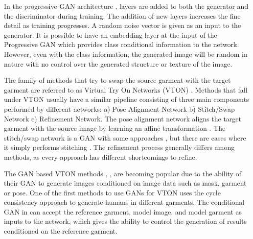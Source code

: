 \documentclass[11pt]{article}
\begin{document}
In the progressive GAN architecture
\citet{PGAN}, layers are added to both the generator and the discriminator during training. 
The addition of new layers increases the fine detail as training progresses. 
A random noise vector is given as an input to the generator. It is possible to have an embedding layer \citet{ConGAN} at the input of the Progressive GAN which provides class conditional information to the network. However, even with the class information, the generated image will be random in nature with no control over the generated structure or texture of the image.

The family of methods that try to swap the source garment with the target garment are referred to as Virtual Try On Networks (VTON) \citet{CP-VTON} \citet{MG-VTON} \citet{VITON}. Methods that fall under VTON usually have a similar pipeline consisting of three main components performed by different networks: a) Pose Alignment Network b) Stitch/Swap Network c) Refinement Network. The pose alignment network aligns the target garment with the source image by learning an affine transformation \citet{GMM}. The stitch/swap network is a GAN with some approaches \citet{MG-VTON}, but there are cases where it simply performs stitching \citet{CP-VTON}.
The refinement process generally differs among methods, as every approach has different shortcomings to refine.

The GAN based VTON methods \citet{CanalogyGAN}, \citet{FashionGAN2}, \citet{ClothingGAN} are becoming popular due to the ability of their GAN to generate images conditioned on image data such as mask, garment or pose.  
One of the first methods to use GANs for VTON \citet{CanalogyGAN} uses the cycle consistency approach to generate humans in different garments. The conditional GAN in \citet{CanalogyGAN} can accept the reference garment, model image, and model garment as inputs to the network, which gives the ability to control the generation of results conditioned on the reference garment.
\end{document}
